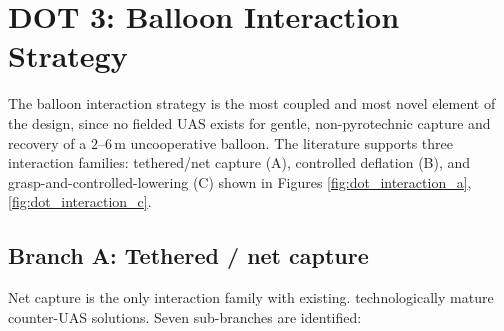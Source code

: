 \section{DOT 3: Balloon Interaction Strategy}
\label{sec:dot_interaction}

The balloon interaction strategy is the most coupled and most novel element of the design, since no fielded UAS exists for gentle, non-pyrotechnic capture and recovery of a $2$--$6\,\mathrm{m}$ uncooperative balloon. The literature supports three interaction families: tethered/net capture (A), controlled deflation (B), and grasp-and-controlled-lowering (C) shown in Figures \ref{fig:dot_interaction_a}, \ref{fig:dot_interaction_c}. 

\subsection{Branch A: Tethered / net capture}

Net capture is the only interaction family with existing. technologically mature counter-UAS solutions. Seven sub-branches are identified:

